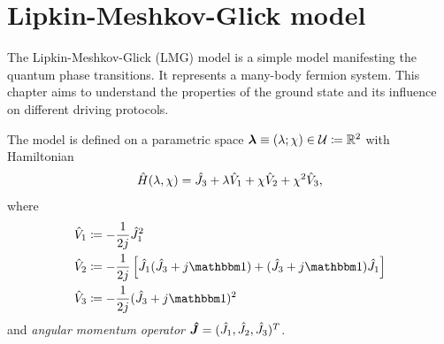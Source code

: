 \chapter{Lipkin-Meshkov-Glick model}
\label{chap:lipkin}

The Lipkin-Meshkov-Glick (LMG) model is a simple model manifesting the quantum phase transitions. It represents a many-body fermion system. This chapter aims to understand the properties of the ground state and its influence on different driving protocols.


The model is defined on a parametric space ${\bm\lambda}\equiv (\lambda;\chi)\in\mathcal U\coloneqq \mathbb{R}^2$ with Hamiltonian
\begin{equation}
    \hat{H}(\lambda,\chi)=\hat{J}_3+\lambda\hat V_1 +\chi \hat V_2+\chi^2 \hat V_3,
    \label{eq:firstOrderTransitionHamiltonian}
\end{equation}
where
\begin{align}
    \hat V_1 &\coloneqq-\frac{1}{2j}\J_1^2\\
    \hat V_2 &\coloneqq -\frac{1}{2j}\left[\J_1(\J_3+j\Id)+(\J_3+j\Id)\J_1\right]\\
    \hat V_3 &\coloneqq -\frac{1}{2j}(\J_3+j\Id)^2
\end{align}
and \emph{angular momentum operator} $\bm{\hat{J}}=(\hat{J}_1,\hat{J}_2,\hat{J}_3)^T$.

